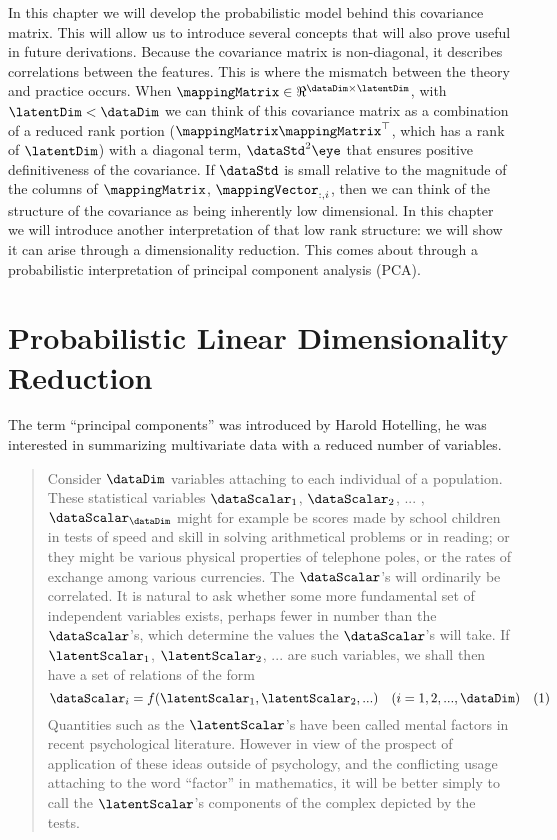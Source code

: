 In this chapter we will develop the probabilistic model behind this
covariance matrix. This will allow us to introduce several concepts
that will also prove useful in future derivations. Because the
covariance matrix is non-diagonal, it describes correlations between
the features. This is where the mismatch between the theory and
practice occurs. When $\mappingMatrix \in \Re^{\dataDim\times
  \latentDim}$, with $\latentDim<\dataDim$ we can think of this
covariance matrix as a combination of a reduced rank portion
($\mappingMatrix\mappingMatrix^\top$, which has a rank of
$\latentDim$) with a diagonal term, $\dataStd^2\eye$ that ensures
positive definitiveness of the covariance.  If $\dataStd$ is small
relative to the magnitude of the columns of $\mappingMatrix$,
$\mappingVector_{:, i}$, then we can think of the structure of the
covariance as being inherently low dimensional. In this chapter we
will introduce another interpretation of that low rank structure: we
will show it can arise through a dimensionality reduction. This comes
about through a probabilistic interpretation of principal component
analysis (PCA).


\section{Probabilistic Linear Dimensionality Reduction}

The term ``principal components'' was introduced by Harold
Hotelling, he was interested in summarizing
multivariate data with a reduced number of variables. \citealp[Quoting
from][page 417:]{Hotelling:analysis33}

\begin{quote}
  Consider $\dataDim$ variables attaching to each individual of a
  population.  These statistical variables $\dataScalar_1$,
  $\dataScalar_2$, ... , $\dataScalar_\dataDim$ might for example be
  scores made by school children in tests of speed and skill in
  solving arithmetical problems or in reading; or they might be
  various physical properties of telephone poles, or the rates of
  exchange among various currencies. The $\dataScalar$'s will
  ordinarily be correlated. It is natural to ask whether some more
  fundamental set of independent variables exists, perhaps fewer in
  number than the $\dataScalar$'s, which determine the values the
  $\dataScalar$'s will take. If $\latentScalar_1$, $\latentScalar_2$,
  ... are such variables, we shall then have a set of relations of the
  form
  \[
  \dataScalar_i = f(\latentScalar_1, \latentScalar_2, ...)\quad (i = 1, 2,
  ..., \dataDim)\quad (1)
  \]
  Quantities such as the $\latentScalar$'s have been called mental
  factors in recent psychological literature. However in view of the
  prospect of application of these ideas outside of psychology, and
  the conflicting usage attaching to the word ``factor'' in mathematics,
  it will be better simply to call the $\latentScalar$'s components of
  the complex depicted by the tests.

\end{quote}

